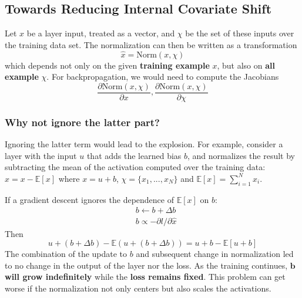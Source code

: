 \documentclass[a3paper, 12pt]{book} %
\begin{document}
\subsection{Towards Reducing Internal Covariate Shift}
Let $x$ be a layer input, treated as a vector, and $\chi$ be the set of these inputs over the training data set. The normalization can then be written as a transformation
$$\hat{x}=\mathrm{Norm}{(x, \chi)}$$ which depends not only on the given \textbf{training example} $x$, but also on \textbf{all example} $\chi$. For backpropagation, we would need to compute the Jacobians
\begin{equation}
\frac{\partial{\mathrm{Norm}{(x,\chi)}}}{\partial{x}}, \frac{\partial{\mathrm{Norm}{(x,\chi)}}}{\partial{\chi}}
\end{equation} 

\subsubsection{Why not ignore the latter part?}
Ignoring the latter term would lead to the explosion. For example, consider a layer
with the input $u$ that adds the learned bias $b$, and normalizes the result by subtracting the mean of the activation computed over the training data: $\hat{x}=x-\mathbb{E}[x]$ where $x=u+b$, $\chi=\{x_1,...,x_N\}$ and $\mathbb{E}[x]=\sum_{i=1}^{N}x_i$.
 
If a gradient descent ignores the dependence of $\mathbb{E}[x]$ on $b$:
\begin{equation}
\begin{split}
	& b \leftarrow b + \Delta{b} \\
    & b \propto -\partial{l} / \partial{\hat{x}}
\end{split}
\end{equation}
Then 
$$u+(b + \Delta{b})-\mathbb{E}{(u+(b + \Delta{b}))}=u+b-\mathbb{E}{[u+b]}$$
The combination of the update to $b$ and subsequent change in normalization led to no change in the output of the layer nor the loss. As the training continues, \textbf{$\mathbf{b}$ will grow indefinitely} while the \textbf{loss remains fixed}. This problem can get worse if the normalization not only centers but also scales the activations.
\end{document}
